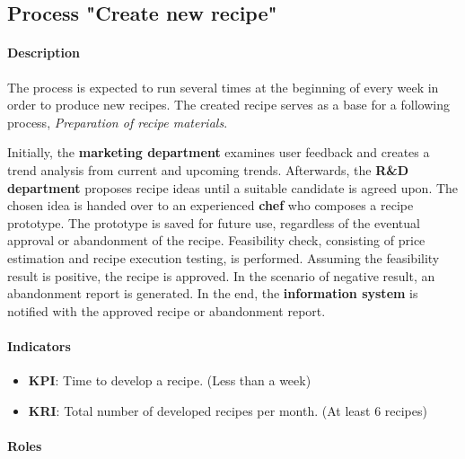 \documentclass[11pt,a4paper]{article}
\begin{document}
\newpage




\subsection{Process "Create new recipe"}

\paragraph{Description}
The process is expected to run several times at the beginning of every week in order to produce new recipes. The created recipe serves as a base for a following process, \emph{Preparation of recipe materials}.

\medskip

Initially, the \textbf{marketing department} examines user feedback and creates a trend analysis from current and upcoming trends. Afterwards, the \textbf{R\&D department} proposes recipe ideas until a suitable candidate is agreed upon. The chosen idea is handed over to an experienced \textbf{chef} who composes a recipe prototype. The prototype is saved for future use, regardless of the eventual approval or abandonment of the recipe. Feasibility check, consisting of price estimation and recipe execution testing, is performed. Assuming the feasibility result is positive, the recipe is approved. In the scenario of negative result, an abandonment report is generated. In the end, the \textbf{information system} is notified with the approved recipe or abandonment report.

\paragraph{Indicators}

\begin{itemize}
    \item \textbf{KPI}: Time to develop a recipe. (Less than a week)
    \item \textbf{KRI}: Total number of developed recipes per month. (At least 6 recipes)
\end{itemize}

\paragraph{Roles}
\end{document}
